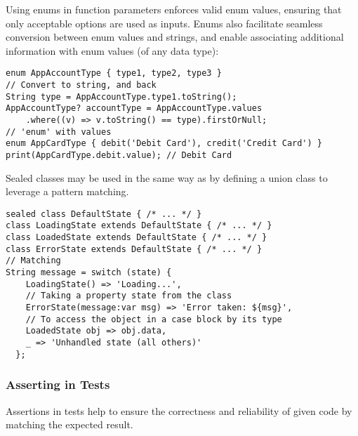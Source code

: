 \noindent Using enums in function parameters enforces valid enum values, ensuring that only acceptable options are used 
as inputs. Enums also facilitate seamless conversion between enum values and strings, and enable associating additional 
information with enum values (of any data type):

\begin{lstlisting}
enum AppAccountType { type1, type2, type3 }
// Convert to string, and back
String type = AppAccountType.type1.toString();
AppAccountType? accountType = AppAccountType.values
    .where((v) => v.toString() == type).firstOrNull;
// 'enum' with values
enum AppCardType { debit('Debit Card'), credit('Credit Card') }
print(AppCardType.debit.value); // Debit Card
\end{lstlisting}

\noindent Sealed classes may be used in the same way as  by defining a union class to leverage a pattern matching.

\begin{lstlisting}
sealed class DefaultState { /* ... */ }
class LoadingState extends DefaultState { /* ... */ }
class LoadedState extends DefaultState { /* ... */ }
class ErrorState extends DefaultState { /* ... */ }
// Matching
String message = switch (state) {
    LoadingState() => 'Loading...',
    // Taking a property state from the class
    ErrorState(message:var msg) => 'Error taken: ${msg}',
    // To access the object in a case block by its type 
    LoadedState obj => obj.data,    
    _ => 'Unhandled state (all others)'
  };
\end{lstlisting}

\newpage
\subsubsection{Asserting in Tests}

Assertions in tests help to ensure the correctness and reliability of given code by matching the expected result.

